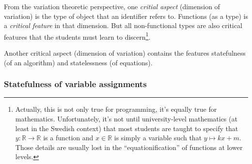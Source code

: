 From the variation theoretic perspective, one \emph{critial aspect} (dimension 
of variation) is the type of object that an identifier refers to.
Functions (as a type) is a \emph{critical feature} in that dimension.
But all non-functional types are also critical features that the students must 
learn to discern\footnote{%
  Actually, this is not only true for programming, it's equally true for 
  mathematics.
  Unfortunately, it's not until university-level mathematics (at least in the 
  Swedish context) that most students are taught to specify that \(y\colon 
  \mathbb{R}\to \mathbb{R}\) is a function and \(x\in\mathbb{R}\) is simply a 
  variable such that \(y\mapsto kx + m\).
  Those details are usually lost in the \enquote{equationification} of 
  functions at lower levels.
}.

Another critical aspect (dimension of variation) contains the features 
statefulness (of an algorithm) and statelessness (of equations).

\subsubsection{Statefulness of variable assignments}

